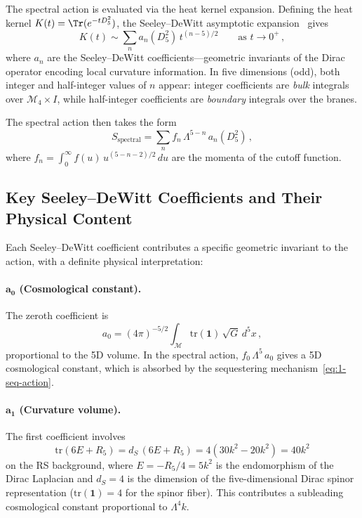 The spectral action is evaluated via the heat kernel expansion. Defining the heat kernel $K(t) = \Tr(e^{-t D_5^2})$, the Seeley--DeWitt asymptotic expansion~\cite{ch1:gilkey75,ch1:branson-gilkey} gives
\begin{equation}
\label{eq:1-heat-kernel}
K(t) \sim \sum_n a_n(D_5^2)\, t^{(n-5)/2} \qquad \text{as } t \to 0^+\,,
\end{equation}
where $a_n$ are the Seeley--DeWitt coefficients---geometric invariants of the Dirac operator encoding local curvature information. In five dimensions (odd), both integer and half-integer values of $n$ appear: integer coefficients are \emph{bulk} integrals over $\mathcal{M}_4 \times I$, while half-integer coefficients are \emph{boundary} integrals over the branes.

The spectral action then takes the form
\begin{equation}
\label{eq:1-spectral-expansion}
S_{\mathrm{spectral}} = \sum_n f_n\, \Lambda^{5-n}\, a_n(D_5^2)\,,
\end{equation}
where $f_n = \int_0^\infty f(u)\, u^{(5-n-2)/2}\, du$ are the momenta of the cutoff function.

\subsection{Key Seeley--DeWitt Coefficients and Their Physical Content}
\label{sec:1-seeley-dewitt}

Each Seeley--DeWitt coefficient contributes a specific geometric invariant to the action, with a definite physical interpretation:

\paragraph{$\bm{a_0}$ (Cosmological constant).} The zeroth coefficient is
\begin{equation}
\label{eq:1-a0}
a_0 = (4\pi)^{-5/2} \int_{\mathcal{M}} \mathrm{tr}(\mathbf{1})\, \sqrt{G}\, d^5x\,,
\end{equation}
proportional to the 5D volume. In the spectral action, $f_0\, \Lambda^5\, a_0$ gives a 5D cosmological constant, which is absorbed by the sequestering mechanism~\eqref{eq:1-seq-action}.

\paragraph{$\bm{a_1}$ (Curvature volume).} The first coefficient involves
\begin{equation}
\label{eq:1-a1}
\mathrm{tr}(6E + R_5) = d_S\,(6E + R_5) = 4(30k^2 - 20k^2) = 40k^2
\end{equation}
on the RS background, where $E = -R_5/4 = 5k^2$ is the endomorphism of the Dirac Laplacian and $d_S = 4$ is the dimension of the five-dimensional Dirac spinor representation ($\mathrm{tr}(\mathbf{1}) = 4$ for the spinor fiber). This contributes a subleading cosmological constant proportional to $\Lambda^4 k$.

